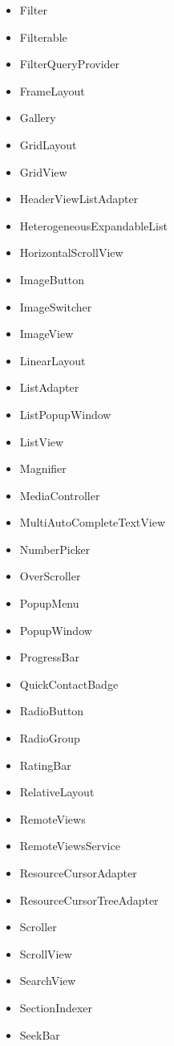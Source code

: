 \documentclass[a4paper,14pt]{extarticle} %
\begin{document}
\begin{itemize}
        \item Filter
        \item Filterable
        \item FilterQueryProvider
        \item FrameLayout
        \item Gallery
        \item GridLayout
        \item GridView
        \item HeaderViewListAdapter
        \item HeterogeneousExpandableList
        \item HorizontalScrollView
        \item ImageButton
        \item ImageSwitcher
        \item ImageView
        \item LinearLayout
        \item ListAdapter
        \item ListPopupWindow
        \item ListView
        \item Magnifier
        \item MediaController
        \item MultiAutoCompleteTextView
        \item NumberPicker
        \item OverScroller
        \item PopupMenu
        \item PopupWindow
        \item ProgressBar
        \item QuickContactBadge
        \item RadioButton
        \item RadioGroup
        \item RatingBar
        \item RelativeLayout
        \item RemoteViews
        \item RemoteViewsService
        \item ResourceCursorAdapter
        \item ResourceCursorTreeAdapter
        \item Scroller
        \item ScrollView
        \item SearchView
        \item SectionIndexer
        \item SeekBar

\end{itemize}
\end{document}
